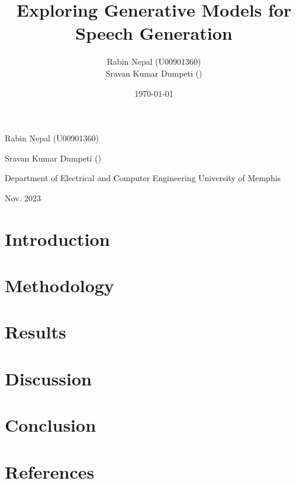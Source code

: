 \documentclass[12pt,a4paper]{report}
\title{Exploring Generative Models for Speech Generation}
\author{ Rabin Nepal (U00901360) \\ Sravan Kumar Dumpeti ()}
\date{\today}
\begin{document}
\maketitle



\begin{titlepage}
    \title{}
    Rabin Nepal (U00901360)

    Sravan Kumar Dumpeti ()
    
    Department of Electrical and Computer Engineering
    University of Memphis
    
    Nov. 2023
        
\end{titlepage}

\section*{Introduction}

\section*{Methodology}

\section*{Results}

\section*{Discussion}

\section*{Conclusion}

\section*{References}
\end{document}
